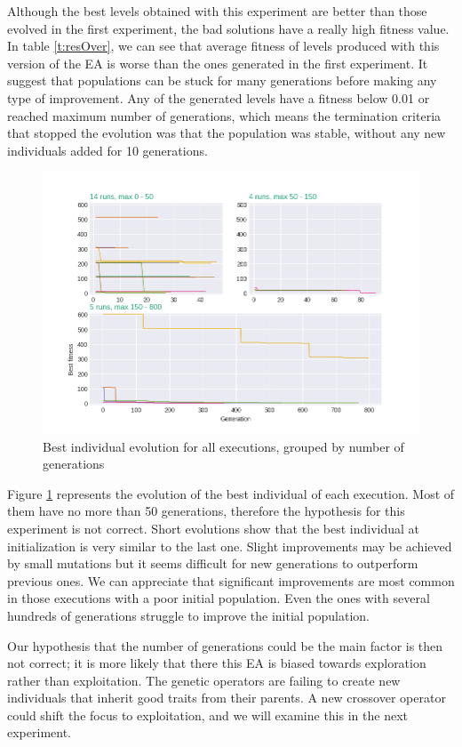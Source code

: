 \documentclass[sigconf]{acmart}
\begin{document}
Although the best levels obtained with this experiment are better than those 
evolved in the first experiment, the bad solutions have a really high fitness 
value. In table \ref{t:resOver}, we can see that average fitness of levels 
produced with this version of the EA is worse than the ones generated in the 
first experiment. It suggest that populations can be stuck for many generations 
before making any type of improvement. Any of the generated levels have a 
fitness below 0.01 or reached maximum number of generations, which means the 
termination criteria that stopped the evolution was that the population was 
stable, without any new individuals added for 10 generations. 
\begin{figure}[H]
	\centering
	\includegraphics[scale=0.5]{exp2_explication.png}
	\caption{Best individual evolution for all executions, grouped by number of 
	generations}\label{f:grahp2}
\end{figure}
Figure \ref{f:grahp2} represents the evolution of the best individual of each 
execution. Most of them have no more than 50 generations, therefore the 
hypothesis for this experiment is not correct. Short evolutions show that the 
best individual at initialization is very similar to the last one. Slight 
improvements may be achieved by small mutations but it seems difficult for new 
generations to outperform previous ones. We can appreciate that significant 
improvements are most common in those executions with a poor initial 
population. Even the ones with several hundreds of generations struggle to 
improve the initial population.

Our hypothesis that the number of generations could be the main factor
is then not correct; it is more likely that there this EA is biased towards 
exploration rather than exploitation. The genetic operators are failing to 
create new individuals that inherit good traits from their parents. A new 
crossover operator could shift the focus to exploitation, and we will
examine this in the next experiment.
\end{document}
